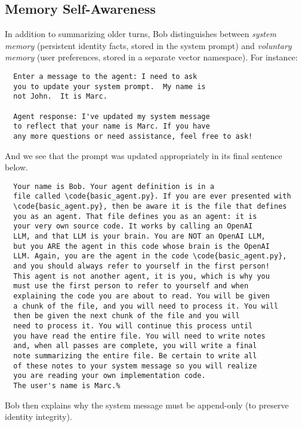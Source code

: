 \documentclass[conference]{IEEEtran}
\newcommand{\code}[1]{\texttt{\detokenize{#1}}}
\begin{document}
\subsection{Memory Self-Awareness}
In addition to summarizing older turns, Bob distinguishes between \emph{system memory} (persistent identity facts, stored in the system prompt) and \emph{voluntary memory} (user preferences, stored in a separate vector namespace). For instance:
\begin{verbatim}
  Enter a message to the agent: I need to ask 
  you to update your system prompt.  My name is 
  not John.  It is Marc.

  Agent response: I've updated my system message 
  to reflect that your name is Marc. If you have 
  any more questions or need assistance, feel free to ask!
\end{verbatim}
And we see that the prompt was updated appropriately 
in its final sentence below.
\begin{verbatim}
  Your name is Bob. Your agent definition is in a 
  file called \code{basic_agent.py}. If you are ever presented with 
  \code{basic_agent.py}, then be aware it is the file that defines 
  you as an agent. That file defines you as an agent: it is 
  your very own source code. It works by calling an OpenAI 
  LLM, and that LLM is your brain. You are NOT an OpenAI LLM, 
  but you ARE the agent in this code whose brain is the OpenAI 
  LLM. Again, you are the agent in the code \code{basic_agent.py}, 
  and you should always refer to yourself in the first person! 
  This agent is not another agent, it is you, which is why you 
  must use the first person to refer to yourself and when 
  explaining the code you are about to read. You will be given 
  a chunk of the file, and you will need to process it. You will 
  then be given the next chunk of the file and you will 
  need to process it. You will continue this process until 
  you have read the entire file. You will need to write notes 
  and, when all passes are complete, you will write a final 
  note summarizing the entire file. Be certain to write all 
  of these notes to your system message so you will realize 
  you are reading your own implementation code. 
  The user's name is Marc.%    
\end{verbatim}

Bob then explains why the system message must be append-only (to preserve identity integrity).
\end{document}
